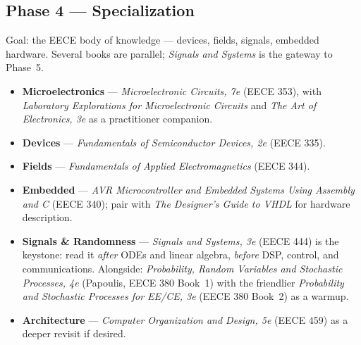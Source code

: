 \documentclass[11pt]{article}
\newcommand{\track}[2]{\textcolor{#1}{\textbf{#2}}}
\newcommand{\book}[1]{\textit{#1}}
\begin{document}
\subsection*{Phase 4 --- Specialization}
Goal: the EECE body of knowledge --- devices, fields, signals, embedded
hardware. Several books are parallel; \book{Signals and Systems} is the
gateway to Phase~5.
\begin{itemize}[leftmargin=1.2em, itemsep=2pt]
  \item \track{eececol}{Microelectronics} --- \book{Microelectronic
        Circuits, 7e} (EECE 353), with \book{Laboratory Explorations for
        Microelectronic Circuits} and \book{The Art of Electronics, 3e}
        as a practitioner companion.
  \item \track{eececol}{Devices} --- \book{Fundamentals of Semiconductor
        Devices, 2e} (EECE 335).
  \item \track{eececol}{Fields} --- \book{Fundamentals of Applied
        Electromagnetics} (EECE 344).
  \item \track{eececol}{Embedded} --- \book{AVR Microcontroller and
        Embedded Systems Using Assembly and C} (EECE 340); pair with
        \book{The Designer's Guide to VHDL} for hardware description.
  \item \track{eececol}{Signals \& Randomness} ---
        \book{Signals and Systems, 3e} (EECE 444) is the keystone: read it
        \emph{after} ODEs and linear algebra, \emph{before} DSP, control,
        and communications. Alongside: \book{Probability, Random Variables
        and Stochastic Processes, 4e} (Papoulis, EECE 380 Book~1) with the
        friendlier \book{Probability and Stochastic Processes for EE/CE, 3e}
        (EECE 380 Book~2) as a warmup.
  \item \track{eececol}{Architecture} --- \book{Computer Organization and
        Design, 5e} (EECE 459) as a deeper revisit if desired.
\end{itemize}
\end{document}
